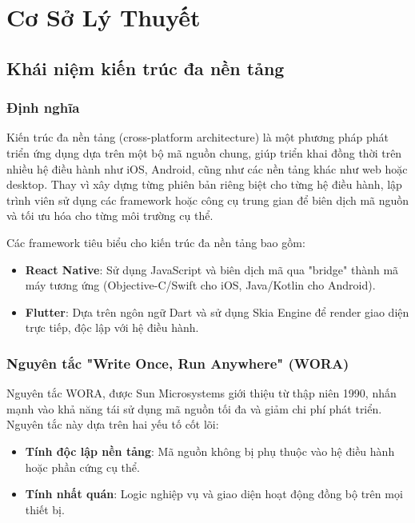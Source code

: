 \section{Cơ Sở Lý Thuyết }

\subsection{Khái niệm kiến trúc đa nền tảng}
\renewcommand{\labelitemi}{--}

\subsubsection{Định nghĩa}
\begin{flushleft}
    \hspace*{0.8cm}Kiến trúc đa nền tảng (cross-platform architecture) là một phương pháp phát triển ứng dụng dựa trên một bộ mã nguồn chung, giúp triển khai đồng thời trên nhiều hệ điều hành như iOS, Android, cũng như các nền tảng khác như web hoặc desktop. Thay vì xây dựng từng phiên bản riêng biệt cho từng hệ điều hành, lập trình viên sử dụng các framework hoặc công cụ trung gian để biên dịch mã nguồn và tối ưu hóa cho từng môi trường cụ thể.
\end{flushleft}

\begin{flushleft}
    \hspace*{0.8cm}Các framework tiêu biểu cho kiến trúc đa nền tảng bao gồm:
    \setlength{\leftmargini}{1.5cm}
    \begin{itemize}
        \item \textbf{React Native}: Sử dụng JavaScript và biên dịch mã qua "bridge" thành mã máy tương ứng (Objective-C/Swift cho iOS, Java/Kotlin cho Android).
        \item \textbf{Flutter}: Dựa trên ngôn ngữ Dart và sử dụng Skia Engine để render giao diện trực tiếp, độc lập với hệ điều hành.
    \end{itemize}
\end{flushleft}

\subsubsection{Nguyên tắc "Write Once, Run Anywhere" (WORA)}
\begin{flushleft}
    \hspace*{0.8cm}Nguyên tắc WORA, được Sun Microsystems giới thiệu từ thập niên 1990, nhấn mạnh vào khả năng tái sử dụng mã nguồn tối đa và giảm chi phí phát triển. Nguyên tắc này dựa trên hai yếu tố cốt lõi:
    \setlength{\leftmargini}{1.5cm}
    \begin{itemize}
        \item \textbf{Tính độc lập nền tảng}: Mã nguồn không bị phụ thuộc vào hệ điều hành hoặc phần cứng cụ thể.
        \item \textbf{Tính nhất quán}: Logic nghiệp vụ và giao diện hoạt động đồng bộ trên mọi thiết bị.
    \end{itemize}
\end{flushleft}


